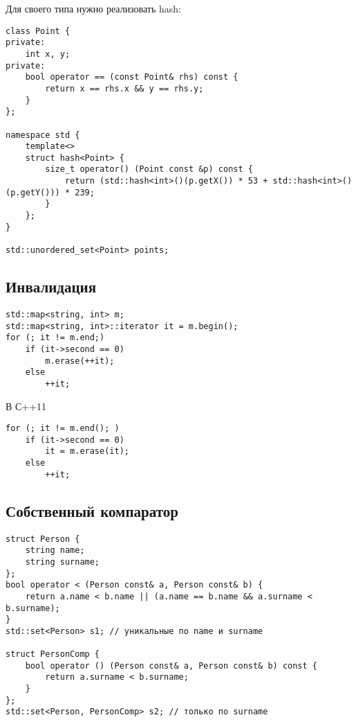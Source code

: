 Для своего типа нужно реализовать hash:
\begin{verbatim}
class Point {
private:
    int x, y;
private:
    bool operator == (const Point& rhs) const {
		return x == rhs.x && y == rhs.y;
	}
};

namespace std {
    template<>
	struct hash<Point> {
	    size_t operator() (Point const &p) const {
		    return (std::hash<int>()(p.getX()) * 53 + std::hash<int>()(p.getY())) * 239;
		}
	};
}

std::unordered_set<Point> points;
\end{verbatim}

\subsection{Инвалидация}
\begin{verbatim}
std::map<string, int> m;
std::map<string, int>::iterator it = m.begin();
for (; it != m.end;)
    if (it->second == 0)
	    m.erase(++it);
	else
	    ++it;
\end{verbatim}
В С++11
\begin{verbatim}
for (; it != m.end(); )
    if (it->second == 0) 
	    it = m.erase(it);
    else
	    ++it;
\end{verbatim}
\subsection{Собственный компаратор}
\begin{verbatim}
struct Person {
    string name;
	string surname;
};
bool operator < (Person const& a, Person const& b) {
    return a.name < b.name || (a.name == b.name && a.surname < b.surname);
}
std::set<Person> s1; // уникальные по name и surname

struct PersonComp {
	bool operator () (Person const& a, Person const& b) const {
	    return a.surname < b.surname;
	}
};
std::set<Person, PersonComp> s2; // только по surname
\end{verbatim}
